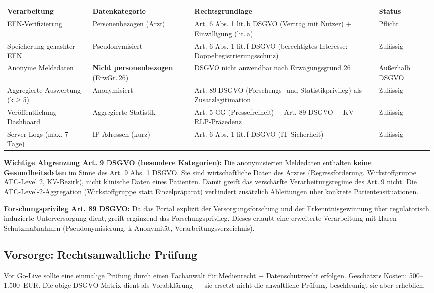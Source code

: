 \documentclass{umbruch-position}
\begin{document}
{\small
\begin{tabularx}{\textwidth}{X X X X}
\toprule
\textbf{Verarbeitung} & \textbf{Datenkategorie} & \textbf{Rechtsgrundlage} & \textbf{Status} \\
\midrule
EFN-Verifizierung & Personenbezogen (Arzt) & Art. 6 Abs. 1 lit.\,b DSGVO (Vertrag mit Nutzer) + Einwilligung (lit.\,a) & Pflicht \\
Speicherung gehashter EFN & Pseudonymisiert & Art. 6 Abs. 1 lit.\,f DSGVO (berechtigtes Interesse: Doppelregistrierungsschutz) & Zulässig \\
Anonyme Meldedaten & \textbf{Nicht personenbezogen} (ErwGr.\,26) & DSGVO nicht anwendbar nach Erwägungsgrund 26 & Außerhalb DSGVO \\
Aggregierte Auswertung (k$\geq$5) & Anonymisiert & Art. 89 DSGVO (Forschungs- und Statistikprivileg) als Zusatzlegitimation & Zulässig \\
Veröffentlichung Dashboard & Aggregierte Statistik & Art. 5 GG (Pressefreiheit) + Art. 89 DSGVO + KV RLP-Präzedenz & Zulässig \\
Server-Logs (max. 7 Tage) & IP-Adressen (kurz) & Art. 6 Abs. 1 lit.\,f DSGVO (IT-Sicherheit) & Zulässig \\
\bottomrule
\end{tabularx}
}

\textbf{Wichtige Abgrenzung Art. 9 DSGVO (besondere Kategorien):} Die anonymisierten Meldedaten enthalten \textbf{keine Gesundheitsdaten} im Sinne des Art. 9 Abs. 1 DSGVO. Sie sind wirtschaftliche Daten des Arztes (Regressforderung, Wirkstoffgruppe ATC-Level 2, KV-Bezirk), nicht klinische Daten eines Patienten. Damit greift das verschärfte Verarbeitungsregime des Art. 9 nicht. Die ATC-Level-2-Aggregation (Wirkstoffgruppe statt Einzelpräparat) verhindert zusätzlich Ableitungen über konkrete Patientensituationen.

\textbf{Forschungsprivileg Art. 89 DSGVO:} Da das Portal explizit der Versorgungsforschung und der Erkenntnisgewinnung über regulatorisch induzierte Unterversorgung dient, greift ergänzend das Forschungsprivileg. Dieses erlaubt eine erweiterte Verarbeitung mit klaren Schutzmaßnahmen (Pseudonymisierung, k-Anonymität, Verarbeitungsverzeichnis).

\subsection{Vorsorge: Rechtsanwaltliche Prüfung}

Vor Go-Live sollte eine einmalige Prüfung durch einen Fachanwalt für Medienrecht + Datenschutzrecht erfolgen. Geschätzte Kosten: 500–1.500 \,EUR. Die obige DSGVO-Matrix dient als Vorabklärung — sie ersetzt nicht die anwaltliche Prüfung, beschleunigt sie aber erheblich.
\end{document}
